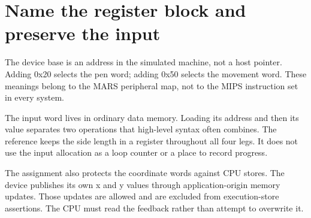 \section{Name the register block and preserve the
  input}\label{006-marsbot-square-p03-name-the-register-block-and-preserve-the-input}

The device base is an address in the simulated machine, not a host
pointer. Adding 0x20 selects the pen word; adding 0x50 selects the
movement word. These meanings belong to the MARS peripheral map, not to
the MIPS instruction set in every system.

The input word lives in ordinary data memory. Loading its address and
then its value separates two operations that high-level syntax often
combines. The reference keeps the side length in a register throughout
all four legs. It does not use the input allocation as a loop counter or
a place to record progress.

The assignment also protects the coordinate words against CPU stores.
The device publishes its own x and y values through application-origin
memory updates. Those updates are allowed and are excluded from
execution-store assertions. The CPU must read the feedback rather than
attempt to overwrite it.
